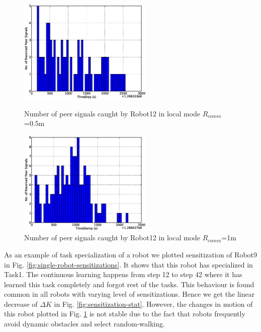 \documentclass[letterpaper, 10 pt, conference]{ieeeconf}  %
\begin{document}
\begin{figure}
\begin{minipage}[t]{0.5\linewidth}
\centering
\includegraphics[height=5cm, angle=0]{images/local-500cm/Robot12-16feb-1-LocalSignals.eps}
\caption{\small Number of peer signals caught by Robot12 in local mode $R_{comm}$=0.5m}
\label{fig:single-robot-sensitizations} %
\end{minipage} 
\begin{minipage}[t]{0.5\linewidth}
\centering
\includegraphics[height=5cm, angle=0]{images/local-1m/Robot12-17feb-3-LocalSignals.eps}
\caption{\small  Number of peer signals caught by Robot12 in local mode $R_{comm}$=1m}
\label{fig:single-robot-translation} %
\end{minipage}
\end{figure}


As an example of task specialization of a robot we plotted sensitization of Robot9 in Fig. \ref{fig:single-robot-sensitizations}. It shows that this robot has specialized in Task1. The continuous learning happens from step 12 to step 42 where it has learned this task completely and forgot rest of the tasks. This behaviour is found common in all robots with varying level of sensitizations. Hence we get the linear decrease of $\Delta K$ in Fig. \ref{fig:sensitization-stat}. However, the changes in motion of this robot plotted in Fig. \ref{fig:single-robot-translation} is not stable due to the fact that robots frequently avoid dynamic obstacles and select random-walking.
%
\end{document}
